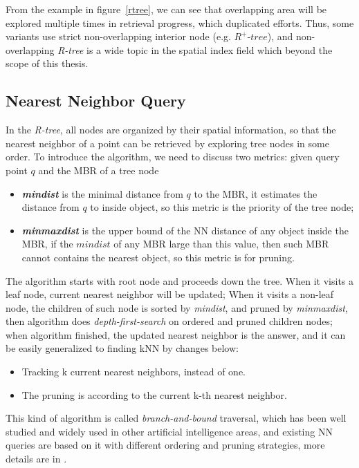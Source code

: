 From the example in figure~\ref{rtree}, we can see that overlapping area will be explored
multiple times in retrieval progress, which duplicated efforts.
Thus, some variants use strict non-overlapping interior node (e.g.
$R^+\textit{-tree}$\cite{sellis1987r+}), and non-overlapping \textit{R-tree} is a wide topic in
the spatial index field which beyond the scope of this thesis.

\subsection{Nearest Neighbor Query}
In the \textit{R-tree}, all nodes are organized by their spatial information,
so that the nearest neighbor of a point can be retrieved by exploring tree nodes in some order.
To introduce the algorithm, we need to discuss two metrics: given query point $q$ and the MBR of a tree node
\begin{itemize}
  \item \textit{\textbf{mindist}} is the minimal distance from $q$ to the MBR, it estimates the
    distance from $q$ to inside object, so this metric is the priority of the tree node;
  \item \textit{\textbf{minmaxdist}} is the upper bound of the NN distance of any object inside
    the MBR, if the $mindist$ of any MBR large than this value, then such MBR cannot contains
    the nearest object, so this metric is for pruning.
\end{itemize}
The algorithm starts with root node and proceeds down the tree. When it visits a leaf node,
current nearest neighbor will be updated;
When it visits a non-leaf node, the children of such node is sorted by \textit{mindist}, and pruned by
\textit{minmaxdist}, then algorithm does \textit{depth-first-search} on ordered and pruned children nodes;
when algorithm finished, the updated nearest neighbor is the answer, and it can be easily
generalized to finding kNN by changes below:
\begin{itemize}
  \item  Tracking k current nearest neighbors, instead of one.
  \item  The pruning is according to the current k-th nearest neighbor.
\end{itemize}

This kind of algorithm is called \textit{branch-and-bound} traversal, which has been well
studied and widely used in other artificial intelligence areas\cite{sellis1987r+},
and existing NN queries are based on it with different ordering and pruning strategies,
more details are in \cite{roussopoulos1995nearest,cheung1998enhanced}.

